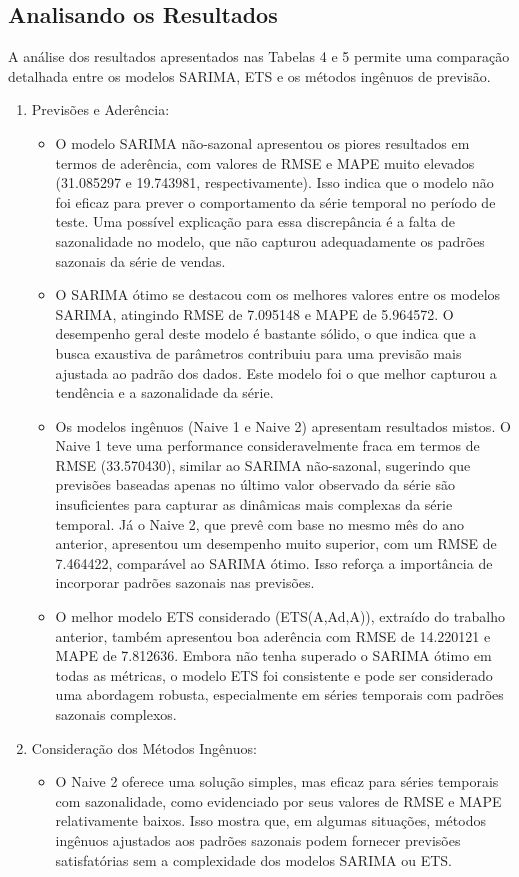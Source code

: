 \documentclass[a4paper, 12pt]{article}
\begin{document}
\subsection{Analisando os Resultados}

A análise dos resultados apresentados nas Tabelas 4 e 5 permite uma comparação detalhada entre os modelos SARIMA, ETS e os métodos ingênuos de previsão. 

\begin{enumerate}
    \item Previsões e Aderência:
    \begin{itemize}
        \item O modelo SARIMA não-sazonal apresentou os piores resultados em termos de aderência, com valores de RMSE e MAPE muito elevados (31.085297 e 19.743981, respectivamente). Isso indica que o modelo não foi eficaz para prever o comportamento da série temporal no período de teste. Uma possível explicação para essa discrepância é a falta de sazonalidade no modelo, que não capturou adequadamente os padrões sazonais da série de vendas.
        \item O SARIMA ótimo se destacou com os melhores valores entre os modelos SARIMA, atingindo RMSE de 7.095148 e MAPE de 5.964572. O desempenho geral deste modelo é bastante sólido, o que indica que a busca exaustiva de parâmetros contribuiu para uma previsão mais ajustada ao padrão dos dados. Este modelo foi o que melhor capturou a tendência e a sazonalidade da série. 
        \item Os modelos ingênuos (Naive 1 e Naive 2) apresentam resultados mistos. O Naive 1 teve uma performance consideravelmente fraca em termos de RMSE (33.570430), similar ao SARIMA não-sazonal, sugerindo que previsões baseadas apenas no último valor observado da série são insuficientes para capturar as dinâmicas mais complexas da série temporal. Já o Naive 2, que prevê com base no mesmo mês do ano anterior, apresentou um desempenho muito superior, com um RMSE de 7.464422, comparável ao SARIMA ótimo. Isso reforça a importância de incorporar padrões sazonais nas previsões.
        \item O melhor modelo ETS considerado (ETS(A,Ad,A)), extraído do trabalho anterior, também apresentou boa aderência com RMSE de 14.220121 e MAPE de 7.812636. Embora não tenha superado o SARIMA ótimo em todas as métricas, o modelo ETS foi consistente e pode ser considerado uma abordagem robusta, especialmente em séries temporais com padrões sazonais complexos.
    \end{itemize}
    \item Consideração dos Métodos Ingênuos:
    \begin{itemize}
        \item O Naive 2 oferece uma solução simples, mas eficaz para séries temporais com sazonalidade, como evidenciado por seus valores de RMSE e MAPE relativamente baixos. Isso mostra que, em algumas situações, métodos ingênuos ajustados aos padrões sazonais podem fornecer previsões satisfatórias sem a complexidade dos modelos SARIMA ou ETS.
    \end{itemize}
\end{enumerate}
\end{document}
